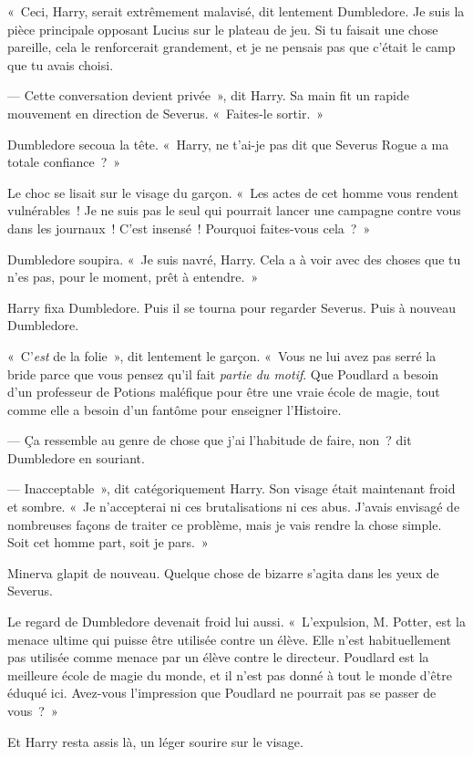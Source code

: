 «~Ceci, Harry, serait extrêmement malavisé, dit lentement Dumbledore.
Je suis la pièce principale opposant Lucius sur le plateau de jeu.
Si tu faisait une chose pareille, cela le renforcerait grandement, et je ne pensais pas que c'était le camp que tu avais choisi.

--- Cette conversation devient privée~», dit Harry.
Sa main fit un rapide mouvement en direction de Severus.
«~Faites-le sortir.~»

Dumbledore secoua la tête.
«~Harry, ne t'ai-je pas dit que Severus Rogue a ma totale confiance~?~»

Le choc se lisait sur le visage du garçon.
«~Les actes de cet homme vous rendent vulnérables~!
Je ne suis pas le seul qui pourrait lancer une campagne contre vous dans les journaux~!
C'est insensé~!
Pourquoi faites-vous cela~?~»

Dumbledore soupira.
«~Je suis navré, Harry.
Cela a à voir avec des choses que tu n'es pas, pour le moment, prêt à entendre.~»

Harry fixa Dumbledore.
Puis il se tourna pour regarder Severus.
Puis à nouveau Dumbledore.

«~C'\emph{est} de la folie~», dit lentement le garçon.
«~Vous ne lui avez pas serré la bride parce que vous pensez qu'il fait \emph{partie du motif}.
Que Poudlard a besoin d'un professeur de Potions maléfique pour être une vraie école de magie, tout comme elle a besoin d'un fantôme pour enseigner l'Histoire.

--- Ça ressemble au genre de chose que j'ai l'habitude de faire, non~? dit Dumbledore en souriant.

--- Inacceptable~», dit catégoriquement Harry.
Son visage était maintenant froid et sombre.
«~Je n'accepterai ni ces brutalisations ni ces abus.
J'avais envisagé de nombreuses façons de traiter ce problème, mais je vais rendre la chose simple.
Soit cet homme part, soit je pars.~»

Minerva glapit de nouveau.
Quelque chose de bizarre s'agita dans les yeux de Severus.

Le regard de Dumbledore devenait froid lui aussi.
«~L'expulsion, M. Potter, est la menace ultime qui puisse être utilisée contre un élève.
Elle n'est habituellement pas utilisée comme menace par un élève contre le directeur.
Poudlard est la meilleure école de magie du monde, et il n'est pas donné à tout le monde d'être éduqué ici.
Avez-vous l'impression que Poudlard ne pourrait pas se passer de vous~?~»

Et Harry resta assis là, un léger sourire sur le visage.

